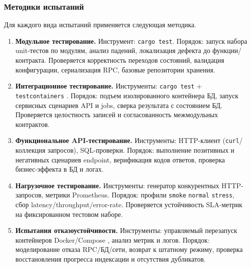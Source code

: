 ﻿\documentclass[14pt,a4paper]{extarticle}
\begin{document}
\subsubsection{Методики испытаний}
\noindent Для каждого вида испытаний применяется следующая методика.
\begin{enumerate}
  \item \textbf{Модульное тестирование.} Инструмент: \texttt{cargo test}. Порядок: запуск набора unit-тестов по модулям, анализ падений, локализация дефекта до функции/контракта. Проверяется корректность переходов состояний, валидация конфигурации, сериализация RPC, базовые репозитории хранения.
  \item \textbf{Интеграционное тестирование.} Инструменты: \texttt{cargo test} + \texttt{testcontainers} \cite{src_testcontainers}. Порядок: подъем изолированного контейнера БД, запуск сервисных сценариев API и jobs, сверка результата с состоянием БД. Проверяется целостность записей и согласованность межмодульных контрактов.
  \item \textbf{Функциональное API-тестирование.} Инструменты: HTTP-клиент (\texttt{curl}/коллекция запросов), SQL-проверки. Порядок: выполнение позитивных и негативных сценариев endpoint, верификация кодов ответов, проверка бизнес-эффекта в БД и логах.
  \item \textbf{Нагрузочное тестирование.} Инструменты: генератор конкурентных HTTP-запросов, метрики Prometheus. Порядок: профили \texttt{smoke} \textrightarrow{} \texttt{normal} \textrightarrow{} \texttt{stress}, сбор latency/throughput/error-rate. Проверяется устойчивость SLA-метрик на фиксированном тестовом наборе.
  \item \textbf{Испытания отказоустойчивости.} Инструменты: управляемый перезапуск контейнеров Docker/Compose \cite{src_docker,src_compose}, анализ метрик и логов. Порядок: моделирование отказа RPC/БД/сети, возврат к штатному режиму, проверка восстановления прогресса индексации и отсутствия дубликатов.
\end{enumerate}
\end{document}

